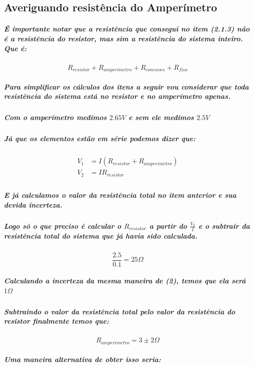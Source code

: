\documentclass[12pt,twoside, a4paper, twocolumn]{article}
\begin{document}
\subsection{Averiguando resistência do Amperímetro}
\subparagraph*{É importante notar que a resistência que consegui no item (2.1.3)  não é a resistência do resistor, mas sim a resistência do sistema inteiro. Que é:}

\begin{equation*}
    R_{resistor} + R_{amperimetro} + R_{conexoes} + R_{fios}
\end{equation*}

\subparagraph*{Para simplificar os cálculos dos itens a seguir vou considerar que toda resistência do sistema está no resistor e no amperímetro apenas.}

\subparagraph*{Com o amperímetro medimos $2.65V$ e sem ele medimos $2.5V$}

\subparagraph*{Já que os elementos estão em série podemos dizer que:}

\begin{equation}
    \begin{aligned}
        V_1 & = I (R_{resistor} + R_{amperimetro}) \\
        V_2 & = I R_{resistor}                     \\
    \end{aligned}
\end{equation}

\subparagraph*{E já calculamos o valor da resistência total no item anterior e sua devida incerteza.}

\subparagraph*{Logo só o que preciso é calcular o $R_{resistor}$ a partir do $\frac{V_2}{I}$ e o subtrair da resistência total do sistema que já havia sido calculada.}

\begin{equation}
    \frac{2.5}{0.1} = 25 \varOmega
\end{equation}

\subparagraph*{Calculando a incerteza da mesma maneira de (2), temos que ela será $1 \varOmega$}

\subparagraph*{Subtraindo o valor da resistência total pelo valor da resistência do resistor finalmente temos que:}

\begin{equation}
    R_{amperimetro} = 3 \pm 2 \varOmega
\end{equation}

\subparagraph*{Uma maneira alternativa de obter isso seria:}
\end{document}
